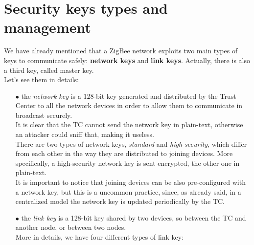\documentclass[12pt]{report}
\begin{document}
\section{Security keys types and management}
\bigskip
We have already mentioned that a ZigBee network exploits two main types of keys to communicate safely: \textbf{network keys} and \textbf{link keys}. Actually, there is also a third key, called master key.\\
Let's see them in details:

\begin{itemize}
\setlength{\itemindent}{+4mm}
\item[$\bullet$] the \emph{network key} is a 128-bit key generated and distributed by the Trust Center to all the network devices in order to allow them to communicate in broadcast securely.\\
It is clear that the TC cannot send the network key in plain-text, otherwise an attacker could sniff that, making it useless.\\
There are two types of network keys, \emph{standard} and \emph{high security}, which differ from each other in the way they are distributed to joining devices. More specifically, a high-security network key is sent encrypted, the other one in plain-text.\\
It is important to notice that joining devices can be also pre-configured with a network key, but this is a uncommon practice, since, as already said,  in a centralized model the network key is updated periodically by the TC.
\item[$\bullet$] the \emph{link key} is a 128-bit key shared by two devices, so between the TC and another node, or between two nodes.\\
More in details, we have four different types of link key:


\end{itemize}
\end{document}
